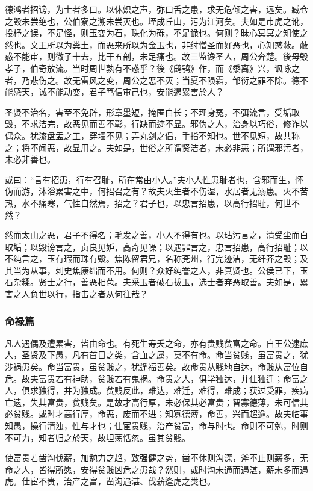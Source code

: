\documentclass[]{article}
\begin{document}
德鸿者招谤，为士者多口。以休炽之声，弥口舌之患，求无危倾之害，远矣。臧仓之毁未尝绝也，公伯寮之溯未尝灭也。垤成丘山，污为江河矣。夫如是市虎之讹，投杼之误，不足怪，则玉变为石，珠化为砾，不足诡也。何则？昧心冥冥之知使之然也。文王所以为粪土，而恶来所以为金玉也，非纣憎圣而好恶也，心知惑蔽。蔽惑不能审，则微子十去，比干五剖，未足痛也。故三监谗圣人，周公奔楚。後母毁孝子，伯奇放流。当时周世孰有不惑乎？後《鸱鸮》作，而《黍离》兴，讽咏之者，乃悲伤之。故无雷风之变，周公之恶不灭；当夏不陨霜，邹衍之罪不除。德不能感天，诚不能动变，君子笃信审己也，安能遏累害於人？

圣贤不治名，害至不免辟，形章墨短，掩匿白长；不理身冤，不弭流言，受垢取毁，不求洁完，故恶见而善不彰，行缺而迹不显。邪伪之人，治身以巧俗，修诈以偶众。犹漆盘盂之工，穿墙不见；弄丸剑之倡，手指不知也。世不见短，故共称之；将不闻恶，故显用之。夫如是，世俗之所谓贤洁者，未必非恶；所谓邪污者，未必非善也。

或曰：``言有招患，行有召耻，所在常由小人。''夫小人性患耻者也，含邪而生，怀伪而游，沐浴累害之中，何招召之有？故夫火生者不伤湿，水居者无溺患。火不苦热，水不痛寒，气性自然焉，招之？君子也，以忠言招患，以高行招耻，何世不然？

然而太山之恶，君子不得名；毛发之善，小人不得有也。以玷污言之，清受尘而白取垢；以毁谤言之，贞良见妒，高奇见噪；以遇罪言之，忠言招患，高行招耻；以不纯言之，玉有瑕而珠有毁。焦陈留君兄，名称兗州，行完迹洁，无纤芥之毁；及其当为从事，刺史焦康绌而不用。何则？众好纯誉之人，非真贤也。公侯已下，玉石杂糅。贤士之行，善恶相苞。夫采玉者破石拔玉，选士者弃恶取善。夫如是，累害之人负世以行，指击之者从何往哉？

\hypertarget{header-n33}{%
\subsubsection{命禄篇}\label{header-n33}}

凡人遇偶及遭累害，皆由命也。有死生寿夭之命，亦有贵贱贫富之命。自王公逮庶人，圣贤及下愚，凡有首目之类，含血之属，莫不有命。命当贫贱，虽富贵之，犹涉祸患矣。命当富贵，虽贫贱之，犹逢福善矣。故命贵从贱地自达，命贱从富位自危。故夫富贵若有神助，贫贱若有鬼祸。命贵之人，俱学独达，并仕独迁；命富之人，俱求独得，并为独成。贫贱反此，难达，难迁，难得，难成；获过受罪，疾病亡遗，失其富贵，贫贱矣。是故才高行厚，未必保其必富贵；智寡德薄，未可信其必贫贱。或时才高行厚，命恶，废而不进；知寡德薄，命善，兴而超逾。故夫临事知愚，操行清浊，性与才也；仕宦贵贱，治产贫富，命与时也。命则不可勉，时则不可力，知者归之於天，故坦荡恬忽。虽其贫贱。

使富贵若凿沟伐薪，加勉力之趋，致强健之势，凿不休则沟深，斧不止则薪多，无命之人，皆得所愿，安得贫贱凶危之患哉？然则，或时沟未通而遇湛，薪未多而遇虎。仕宦不贵，治产之富，凿沟遇湛、伐薪逢虎之类也。
\end{document}
